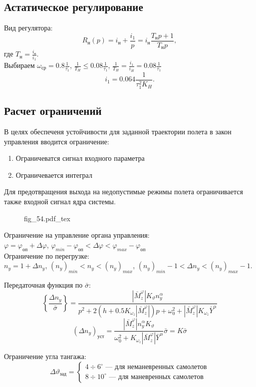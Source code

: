 \documentclass{article}
\newcommand{\incfig}[1]{
    {#1.pdf_tex}
}
\begin{document}
\subsection{Астатическое регулирование}
Вид регулятора:
\[
R_н(p) = i_н +\frac{i_1}{p}  = i_н \frac{T_н p  + 1}{T_н p},
\]
где $T_н =\frac{i_н}{i_1}$.\\
Выбираем $\omega_{ср} = 0.8 \frac{1}{\tau_1}$, $\frac{1}{T_H} \le 0.08\frac{1}{\tau_1}$, $\frac{1}{T_H} = \frac{i_1}{i_H} = 0.08\frac{1}{\tau_1}$
\[
    i_1 = 0.064 \frac{1}{\tau_1^2 K_H}
.\]

\subsection{Расчет ограничений}
В целях обеспеченя устойчивости для заданной траектории полета в закон управления вводится ограничение:
\begin{enumerate}
    \item Ограничеватся сигнал входного параметра
    \item Ограничевается интеграл
\end{enumerate}

Для предотвращения выхода на недопустимые режимы полета ограничивается также входной сигнал ядра системы.
\begin{figure}[H]
    \centering
    \incfig{fig_54}
    \label{fig:fig_54}
\end{figure}

Ограничение на управление органа управления:\\
$\varphi = \varphi_{оп} + \Delta \varphi$, $\varphi_{min} - \varphi_{оп} < \Delta \varphi < \varphi_{max} - \varphi_{оп}$\\
Ограничение по перегрузке:\\
$n_y = 1 + \Delta n_y$, $(n_y)_{min} < n_y < (n_y)_{max}$, $(n_y)_{min} - 1 < \Delta n_y < (n_y)_{max} - 1$.  

Передаточная функция по $\bar{\sigma}$:
\[
    \left\{\frac{\Delta n_y}{\bar{\sigma}} \right\} =\frac{|\bar{M}_z^\varphi| K_{\vartheta} n_y^\alpha}{ p^2 + 2(h + 0.5 K_{\omega_z} | \bar{M}_z^{\varphi} |)p + \omega_0^2 + | \bar{M}_z^{\varphi}| K_{\omega_z} \bar{Y}^\alpha} 
\]
\[
    \left( \Delta n_y\right)_{уст} = \frac{| \bar{M}_z^{\varphi}| n_y^\alpha K_\vartheta}{\omega_0^2 + K_{\omega_z} | \bar{M}_z^{\varphi} | \bar{Y}^\alpha} \bar{\sigma} = K \bar{\sigma}
\]

Ограничение угла тангажа:
\begin{equation}
    \Delta \vartheta_{зад} =
\begin{cases}
    4 \div 6^\circ \text{ --- для неманевренных самолетов}\\
    8 \div 10^\circ \text{ --- для маневренных самолетов}

\end{cases}    
\end{equation}
\end{document}
